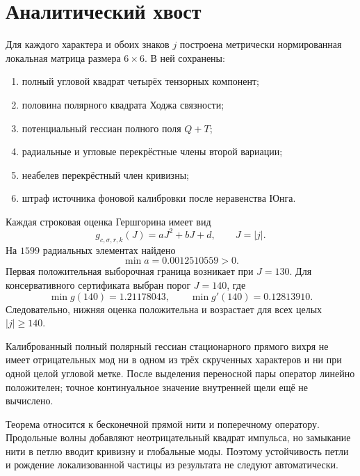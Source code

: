 \section{Аналитический хвост}

Для каждого характера и обоих знаков $j$ построена метрически нормированная
локальная матрица размера $6\times6$. В ней сохранены:
\begin{enumerate}
 \item полный угловой квадрат четырёх тензорных компонент;
 \item половина полярного квадрата Ходжа связности;
 \item потенциальный гессиан полного поля $Q+T$;
 \item радиальные и угловые перекрёстные члены второй вариации;
 \item неабелев перекрёстный член кривизны;
 \item штраф источника фоновой калибровки после неравенства Юнга.
\end{enumerate}

Каждая строковая оценка Гершгорина имеет вид
\begin{equation}
 g_{c,\sigma,r,k}(J)=aJ^2+bJ+d,
 \qquad J=|j|.
\end{equation}
На $1599$ радиальных элементах найдено
\begin{equation}
 \min a=0.0012510559>0.
\end{equation}
Первая положительная выборочная граница возникает при $J=130$. Для
консервативного сертификата выбран порог $J=140$, где
\begin{equation}
 \min g(140)=1.21178043,
 \qquad
 \min g'(140)=0.12813910.
\end{equation}
Следовательно, нижняя оценка положительна и возрастает для всех целых
$|j|\ge140$.

\begin{theorem}
Калиброванный полный полярный гессиан стационарного прямого вихря не имеет
отрицательных мод ни в одном из трёх скрученных характеров и ни при одной
целой угловой метке. После выделения переносной пары оператор линейно
положителен; точное континуальное значение внутренней щели ещё не вычислено.
\end{theorem}

\begin{nogocriterion}
Теорема относится к бесконечной прямой нити и поперечному оператору.
Продольные волны добавляют неотрицательный квадрат импульса, но замыкание
нити в петлю вводит кривизну и глобальные моды. Поэтому устойчивость петли и
рождение локализованной частицы из результата не следуют автоматически.
\end{nogocriterion}

